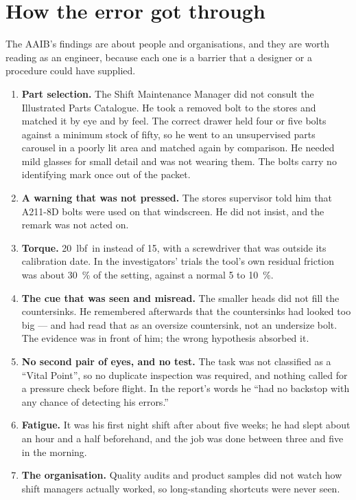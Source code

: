 \documentclass[11pt,a4paper]{article}
\begin{document}
\section{How the error got through}

The AAIB's findings are about people and organisations, and they are worth reading as an engineer,
because each one is a barrier that a designer or a procedure could have supplied.

\begin{enumerate}[leftmargin=*,itemsep=3pt]
\item \textbf{Part selection.} The Shift Maintenance Manager did not consult the Illustrated Parts
  Catalogue. He took a removed bolt to the stores and matched it by eye and by feel. The correct
  drawer held four or five bolts against a minimum stock of fifty, so he went to an unsupervised
  parts carousel in a poorly lit area and matched again by comparison. He needed mild glasses for
  small detail and was not wearing them. The bolts carry no identifying mark once out of the
  packet.
\item \textbf{A warning that was not pressed.} The stores supervisor told him that A211-8D bolts
  were used on that windscreen. He did not insist, and the remark was not acted on.
\item \textbf{Torque.} \SI{20}{lbf.in} instead of 15, with a screwdriver that was outside its
  calibration date. In the investigators' trials the tool's own residual friction was about
  \SI{30}{\percent} of the setting, against a normal 5 to \SI{10}{\percent}.
\item \textbf{The cue that was seen and misread.} The smaller heads did not fill the countersinks.
  He remembered afterwards that the countersinks had looked too big --- and had read that as an
  oversize countersink, not an undersize bolt. The evidence was in front of him; the wrong
  hypothesis absorbed it.
\item \textbf{No second pair of eyes, and no test.} The task was not classified as a ``Vital
  Point'', so no duplicate inspection was required, and nothing called for a pressure check before
  flight. In the report's words he ``had no backstop with any chance of detecting his errors.''
\item \textbf{Fatigue.} It was his first night shift after about five weeks; he had slept about an
  hour and a half beforehand, and the job was done between three and five in the morning.
\item \textbf{The organisation.} Quality audits and product samples did not watch how shift
  managers actually worked, so long-standing shortcuts were never seen.
\end{enumerate}
\end{document}
